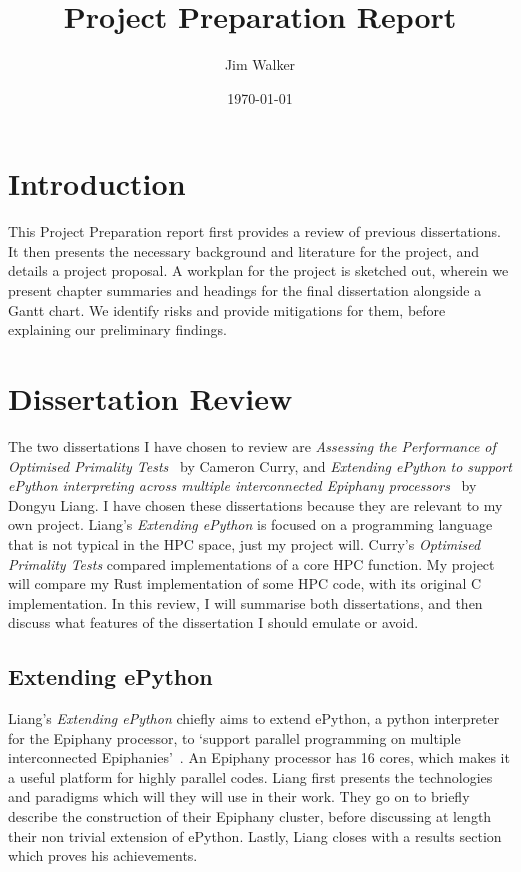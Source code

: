 \documentclass{article}[a4]
\begin{document}
\title{Project Preparation Report}
\author{Jim Walker}
\date{\today}

\makeEPCCtitle

\thispagestyle{empty}

\pagebreak
\tableofcontents
\pagebreak

\section{Introduction}
This Project Preparation report first provides a review of previous dissertations. It then presents the necessary background and literature for the project, and details a project proposal. A workplan for the project is sketched out, wherein we present chapter summaries and headings for the final dissertation alongside a Gantt chart. We identify risks and provide mitigations for them, before explaining our preliminary findings.
\section{Dissertation Review}
The two dissertations I have chosen to review are \textit{Assessing the Performance of Optimised Primality Tests}~\cite{Curry2016} by Cameron Curry, and \textit{Extending ePython to support ePython interpreting across multiple interconnected Epiphany processors}~\cite{Liang2017} by Dongyu Liang. I have chosen these dissertations because they are relevant to my own project. Liang's \textit{Extending ePython} is focused on a programming language that is not typical in the HPC space, just my project will. Curry's \textit{Optimised Primality Tests} compared implementations of a core HPC function. My project will compare my Rust implementation of some HPC code, with its original C implementation. In this review, I will summarise both dissertations, and then discuss what features of the dissertation I should emulate or avoid.

\subsection{Extending ePython}

Liang's \textit{Extending ePython} chiefly aims to extend ePython, a python interpreter for the Epiphany processor, to `support parallel programming on multiple interconnected Epiphanies'~\cite{Liang2017}. An Epiphany processor has 16 cores, which makes it a useful platform for highly parallel codes. Liang first presents the technologies and paradigms which will they will use in their work. They go on to briefly describe the construction of their Epiphany cluster, before discussing at length their non trivial extension of ePython. Lastly, Liang closes with a results section which proves his achievements.
\end{document}
